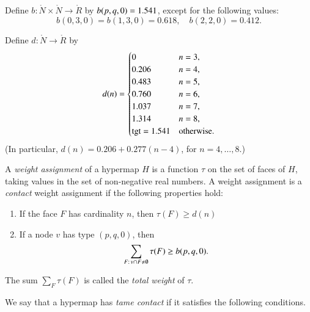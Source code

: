 \begin{definition}[b]
Define $b:\ring{N}\times \ring{N}\to \ring{R}$ by $b(p,q,0)=1.541$,   except for the following values:
$$
b(0,3,0)=b(1,3,0)=0.618,\quad b(2,2,0)=0.412.
$$
\end{definition}

\begin{definition}[d]
    Define $d:\ring{N}\to \ring{R}$ by
  $$d(n) = \begin{cases}
    0 & n=3, \\
    0.206 & n=4, \\
    0.483 & n=5, \\
    0.760 & n=6, \\
    1.037 & n=7, \\
    1.314 & n=8,\\
    {\operatorname{tgt}}=1.541 & \text{otherwise}.
  \end{cases}
  $$
(In particular, $d(n) = 0.206 + 0.277 (n-4)$, for $n=4,\ldots,8$.)
\end{definition}

\begin{definition}
%
A {\it weight assignment\/} of a hypermap $H$ is a function $\tau$ on
the set of faces of $H$, taking values in the set of non-negative
real numbers. A weight assignment is a {\it contact} weight assignment if the
following properties hold:
%
\begin{enumerate}
  \item If the face $F$ has cardinality $n$, then
        $\tau(F) \ge d(n)$
  \item If a node $v$ has type $(p,q,0)$, then
        $$\sum_{F:\,v\cap F\ne\emptyset} \tau(F) \ge b{(p,q,0)}.$$
\end{enumerate}
The sum $\sum_F \tau(F)$ is called the {\it total weight} of $\tau$.
\end{definition}



We say that a hypermap has {\it tame contact\/} if it satisfies the following
conditions.
%


